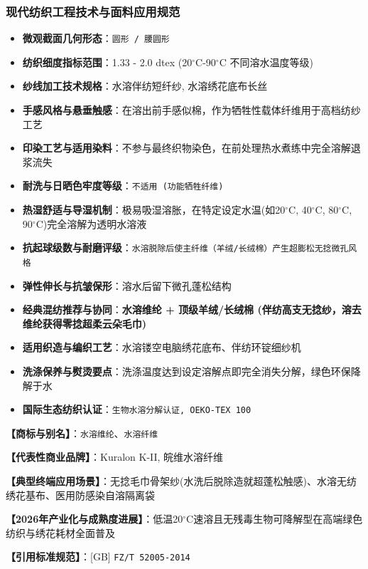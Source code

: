 \documentclass[11pt,openright,twoside,UTF8]{ctexbook}
\begin{document}
\subsubsection*{现代纺织工程技术与面料应用规范}
\begin{itemize} \setlength{\itemsep}{2pt}
    \item \textbf{微观截面几何形态}：\texttt{圆形 / 腰圆形}
    \item \textbf{纺织细度指标范围}：1.33 - 2.0 dtex (20$^\circ\mathrm{C}$-90$^\circ\mathrm{C}$ 不同溶水温度等级)
    \item \textbf{纱线加工技术规格}：水溶伴纺短纤纱, 水溶绣花底布长丝
    \item \textbf{手感风格与悬垂触感}：在溶出前手感似棉，作为牺牲性载体纤维用于高档纺纱工艺
    \item \textbf{印染工艺与适用染料}：不参与最终织物染色，在前处理热水煮练中完全溶解退浆流失
    \item \textbf{耐洗与日晒色牢度等级}：\texttt{不适用 (功能牺牲纤维)}
    \item \textbf{热湿舒适与导湿机制}：极易吸湿溶胀，在特定设定水温(如20$^\circ\mathrm{C}$, 40$^\circ\mathrm{C}$, 80$^\circ\mathrm{C}$, 90$^\circ\mathrm{C}$)完全溶解为透明水溶液
    \item \textbf{抗起球级数与耐磨评级}：\texttt{水溶脱除后使主纤维（羊绒/长绒棉）产生超膨松无捻微孔风格}
    \item \textbf{弹性伸长与抗皱保形}：溶水后留下微孔蓬松结构
    \item \textbf{经典混纺推荐与协同}：\textbf{水溶维纶 + 顶级羊绒/长绒棉 (伴纺高支无捻纱，溶去维纶获得零捻超柔云朵毛巾)}
    \item \textbf{适用织造与编织工艺}：水溶镂空电脑绣花底布、伴纺环锭细纱机
    \item \textbf{洗涤保养与熨烫要点}：洗涤温度达到设定溶解点即完全消失分解，绿色环保降解于水
    \item \textbf{国际生态纺织认证}：\texttt{生物水溶分解认证, OEKO-TEX 100}
\end{itemize}
\vspace{0.2cm}

\noindent\textbf{【商标与别名】}：\texttt{水溶维纶}、\texttt{水溶纤维}\par
\noindent\textbf{【代表性商业品牌】}：Kuralon K-II, 皖维水溶纤维\par
\noindent\textbf{【典型终端应用场景】}：无捻毛巾骨架纱(水洗后脱除造就超蓬松触感)、水溶无纺绣花基布、医用防感染自溶隔离袋\par
\noindent\textbf{【2026年产业化与成熟度进展】}：低温20$^\circ\mathrm{C}$速溶且无残毒生物可降解型在高端绿色纺织与绣花耗材全面普及\par
\noindent\textbf{【引用标准规范】}：[GB] \texttt{FZ/T 52005-2014}\par
\vspace{0.5cm}
\end{document}
